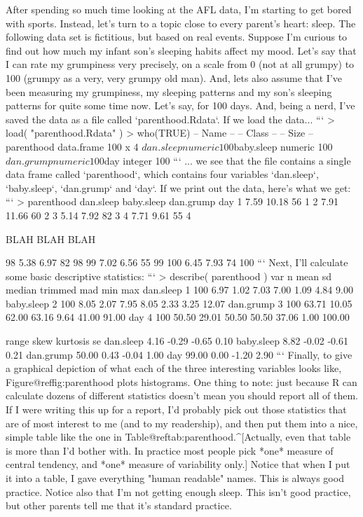 After spending so much time looking at the AFL data, I'm starting to get bored with sports. Instead, let's turn to a topic close to every parent's heart: sleep. The following data set is fictitious, but based on real events. Suppose I'm curious to find out how much my infant son's sleeping habits affect my mood. Let's say that I can rate my grumpiness very precisely, on a scale from 0 (not at all grumpy) to 100 (grumpy as a very, very grumpy old man). And, lets also assume that I've been measuring my grumpiness, my sleeping patterns and my son's sleeping patterns for quite some time now. Let's say, for 100 days. And, being a nerd, I've saved the data as a file called `parenthood.Rdata`. If we load the data...
```
> load( "parenthood.Rdata" )
> who(TRUE)
   -- Name --     -- Class --   -- Size --
   parenthood     data.frame    100 x 4   
    $dan.sleep    numeric       100       
    $baby.sleep   numeric       100       
    $dan.grump    numeric       100       
    $day          integer       100         
```
... we see that the file contains a single data frame called `parenthood`, which contains four variables `dan.sleep`, `baby.sleep`, `dan.grump` and `day`. If we print out the data, here's what we get:
```
> parenthood
  dan.sleep baby.sleep dan.grump day
1      7.59      10.18        56   1
2      7.91      11.66        60   2
3      5.14       7.92        82   3
4      7.71       9.61        55   4

BLAH BLAH BLAH

98       5.38       6.97        82  98
99       7.02       6.56        55  99
100      6.45       7.93        74 100
```
Next, I'll calculate some basic descriptive statistics:
```
> describe( parenthood )
           var   n  mean    sd median trimmed   mad   min    max
dan.sleep    1 100  6.97  1.02   7.03    7.00  1.09  4.84   9.00
baby.sleep   2 100  8.05  2.07   7.95    8.05  2.33  3.25  12.07
dan.grump    3 100 63.71 10.05  62.00   63.16  9.64 41.00  91.00
day          4 100 50.50 29.01  50.50   50.50 37.06  1.00 100.00

           range  skew kurtosis   se
dan.sleep   4.16 -0.29    -0.65 0.10
baby.sleep  8.82 -0.02    -0.61 0.21
dan.grump  50.00  0.43    -0.04 1.00
day        99.00  0.00    -1.20 2.90
```
Finally, to give a graphical depiction of what each of the three interesting variables looks like, Figure@reffig:parenthood plots histograms. One thing to note: just because R can calculate dozens of different statistics doesn't mean you should report all of them. If I were writing this up for a report, I'd probably pick out those statistics that are of most interest to me (and to my readership), and then put them into a nice, simple table like the one in Table@reftab:parenthood.^[Actually, even that table is more than I'd bother with. In practice most people pick *one* measure of central tendency, and *one* measure of variability only.]  Notice that when I put it into a table, I gave everything "human readable" names. This is always good practice. Notice also that I'm not getting enough sleep. This isn't good practice, but other parents tell me that it's standard practice.  




